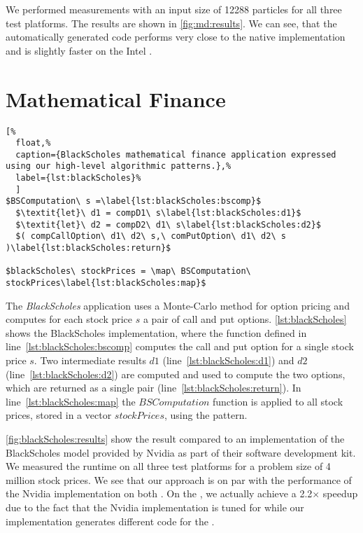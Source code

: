 We performed measurements with an input size of 12288 particles for all three test platforms.
The results are shown in \autoref{fig:md:results}.
We can see, that the automatically generated \OpenCL code performs very close to the native \OpenCL implementation and is slightly faster on the Intel \CPU.



\section{Mathematical Finance}

\begin{lstlisting}[%
  float,%
  caption={BlackScholes mathematical finance application expressed using our high-level algorithmic patterns.},%
  label={lst:blackScholes}%
  ]
$BSComputation\ s =\label{lst:blackScholes:bscomp}$
  $\textit{let}\ d1 = compD1\ s\label{lst:blackScholes:d1}$
  $\textit{let}\ d2 = compD2\ d1\ s\label{lst:blackScholes:d2}$
  $( compCallOption\ d1\ d2\ s,\ comPutOption\ d1\ d2\ s )\label{lst:blackScholes:return}$

$blackScholes\ stockPrices = \map\ BSComputation\ stockPrices\label{lst:blackScholes:map}$
\end{lstlisting}

The \emph{BlackScholes} application uses a Monte-Carlo method for option pricing and computes for each stock price $s$ a pair of call and put options.
\autoref{lst:blackScholes} shows the BlackScholes implementation, where the function defined in line~\ref{lst:blackScholes:bscomp} computes the call and put option for a single stock price $s$.
Two intermediate results $d1$ (line~\ref{lst:blackScholes:d1}) and $d2$ (line~\ref{lst:blackScholes:d2}) are computed and used to compute the two options, which are returned as a single pair (line~\ref{lst:blackScholes:return}).
In line~\ref{lst:blackScholes:map} the $BSComputation$ function is applied to all stock prices, stored in a vector $stockPrices$, using the \map pattern.


\autoref{fig:blackScholes:results} show the result compared to an \OpenCL implementation of the BlackScholes model provided by Nvidia as part of their software development kit.
We measured the runtime on all three test platforms for a problem size of 4 million stock prices.
We see that our approach is on par with the performance of the Nvidia implementation on both \GPUs.
On the \CPU, we actually achieve a 2.2$\times$ speedup due to the fact that the Nvidia implementation is tuned for \GPUs while our implementation generates different code for the \CPU.







